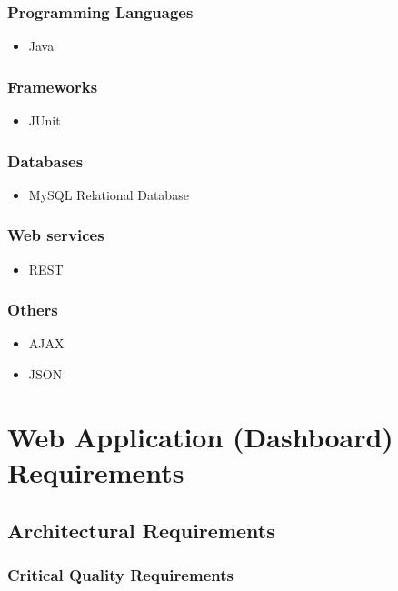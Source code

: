 \documentclass[hidelinks, 12pt, oneside]{article}
\begin{document}
	\subsubsection{Programming Languages}
	\begin{itemize}
	\item Java
	\end{itemize}
	\subsubsection{Frameworks}
	\begin{itemize}
	\item JUnit
	\end{itemize}
	\subsubsection{Databases}
	\begin{itemize}
	\item MySQL Relational Database
	\end{itemize}
	\subsubsection{Web services}
	\begin{itemize}
	\item REST
	\end{itemize}
	\subsubsection{Others}
	\begin{itemize}
	\item AJAX
	\item JSON
	\end{itemize}		
	
\newpage
\section{Web Application (Dashboard) Requirements}
\subsection{Architectural Requirements}
		\subsubsection{Critical Quality Requirements} 
\end{document}
